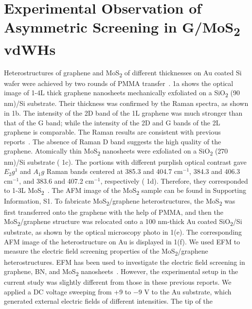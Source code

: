 \section{Experimental Observation of Asymmetric Screening in G/MoS\textsubscript{2} vdWHs}
\label{sec:asym-exp}
Heterostructures of graphene and MoS\textsubscript{2} of different thicknesses on Au
coated Si wafer were achieved by two rounds of PMMA
transfer~\cite{Minemawari_2011_inkjet_PMMA}.  1a shows the
optical image of 1-4L thick graphene nanosheets mechanically
exfoliated on a SiO\textsubscript{2} (90 nm)/Si substrate. Their thickness was
confirmed by the Raman spectra, as shown in  1b. The intensity
of the 2D band of the 1L graphene was much stronger than that of the G
band; while the intensity of the 2D and G bands of the 2L graphene is
comparable. The Raman results are consistent with previous
reports~\cite{Ferrari_2006_raman}.  The absence of Raman D band
suggests the high quality of the graphene. Atomically thin MoS\textsubscript{2}
nanosheets were exfoliated on a SiO\textsubscript{2} (270 nm)/Si substrate (
1c). The portions with different purplish optical contrast gave
$E_2g^1$ and $A_1g$ Raman bands centered at 385.3 and 404.7 cm$^{-1}$,
384.3 and 406.3 cm$^{-1}$, and 383.6 and 407.2 cm$^{-1}$, respectively (
1d). Therefore, they corresponded to 1-3L
MoS\textsubscript{2}~\cite{Lee_2010_anomal_raman_mos2,Chakraborty_2012_mos2_layer_raman}. The
AFM image of the MoS\textsubscript{2} sample can be found in Supporting Information,
 S1. To fabricate MoS\textsubscript{2}/graphene heterostructures, the MoS\textsubscript{2} was
first transferred onto the graphene with the help of PMMA, and then
the MoS\textsubscript{2}/graphene structure was relocated onto a 100 nm-thick Au
coated SiO\textsubscript{2}/Si substrate, as shown by the optical microscopy photo in
 1(e). The corresponding AFM image of the heterostructure on Au
is displayed in  1(f).  We used EFM to measure the electric
field screening properties of the MoS\textsubscript{2}/graphene heterostructures. EFM
has been used to investigate the electric field screening in graphene,
BN, and MoS\textsubscript{2}
nanosheets~\cite{Datta_2009_ML_Screening,Castellanos_Gomez_2012_interlayer,Li_2014_screen}.
%
However, the experimental setup in the current study was slightly
different from those in these previous reports. We applied a DC
voltage sweeping from +9 to −9 V to the Au substrate, which generated
external electric fields of different intensities. The tip of the

